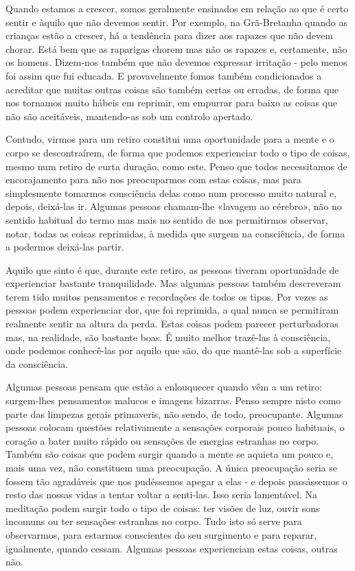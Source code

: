 Quando estamos a crescer, somos geralmente ensinados em relação ao que é
certo sentir e àquilo que não devemos sentir. Por exemplo, na
Grã-Bretanha quando as crianças estão a crescer, há a tendência para
dizer aos rapazes que não devem chorar. Está bem que as raparigas chorem
mas não os rapazes e, certamente, não os homens. Dizem-nos também que
não devemos expressar irritação - pelo menos foi assim que fui educada.
E provavelmente fomos também condicionados a acreditar que muitas outras
coisas são também certas ou erradas, de forma que nos tornamos muito
hábeis em reprimir, em empurrar para baixo as coisas que não são
aceitáveis, mantendo-as sob um controlo apertado.

Contudo, virmos para um retiro constitui uma oportunidade para a mente e
o corpo se descontraírem, de forma que podemos experienciar todo o tipo
de coisas, mesmo num retiro de curta duração, como este. Penso que todos
necessitamos de encorajamento para não nos preocuparmos com estas
coisas, mas para simplesmente tomarmos consciência delas como num
processo muito natural e, depois, deixá-las ir. Algumas pessoas
\mbox{chamam-lhe} «lavagem ao cérebro», não no sentido habitual do termo mas
mais no sentido de nos permitirmos observar, notar, todas as coisas
reprimidas, à medida que surgem na consciência, de forma a podermos
deixá-las partir.

Aquilo que sinto é que, durante este retiro, as pessoas tiveram
oportunidade de experienciar bastante tranquilidade. Mas algumas pessoas
também descreveram terem tido muitos pensamentos e recordações de todos
os tipos. Por vezes as pessoas podem experienciar dor, que foi
reprimida, a qual nunca se permitiram realmente sentir na altura da
perda. Estas coisas podem parecer perturbadoras mas, na realidade, são
bastante boas. É muito melhor trazê-las à consciência, onde podemos
conhecê-las por aquilo que são, do que mantê-las sob a superfície da
consciência.

Algumas pessoas pensam que estão a enlouquecer quando vêm a um retiro:
surgem-lhes pensamentos malucos e imagens bizarras. Penso sempre nisto
como parte das limpezas gerais primaveris, não sendo, de todo,
preocupante. Algumas pessoas colocam questões relativamente a sensações
corporais pouco habituais, o coração a bater muito rápido ou sensações
de energias estranhas no corpo. Também são coisas que podem surgir
quando a mente se aquieta um pouco e, mais uma vez, não constituem uma
preocupação. A única preocupação seria se fossem tão agradáveis que nos
pudéssemos apegar a elas - e depois passássemos o resto das nossas vidas
a tentar voltar a senti-las. Isso seria lamentável. Na meditação podem
surgir todo o tipo de coisas: ter visões de luz, ouvir sons incomuns ou
ter sensações estranhas no corpo. Tudo isto só serve para observarmos,
para estarmos conscientes do seu surgimento e para reparar, igualmente,
quando cessam. Algumas pessoas experienciam estas coisas, outras não.

